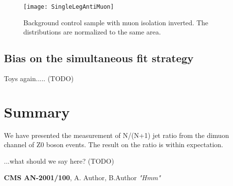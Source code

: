 \documentclass{cmspaper}
\begin{document}
\begin{figure}[hbtp]
\begin{center}
\texttt{[image: SingleLegAntiMuon]}
\caption{Background control sample with muon isolation inverted.  The distributions are normalized to the same area.}
\label{Figure_AntiMuonSingleLeg}
\end{center}
\end{figure}

\subsection{Bias on the simultaneous fit strategy}

Toys again.....  (TODO)

\section{Summary}

We have presented the measurement of N/(N+1) jet ratio from the dimuon channel of Z0 boson events.
The result on the ratio is within expectation.

...what should we say here?  (TODO)


\begin{thebibliography}{9}
    {\bf CMS AN-2001/100},
      A. Author, B.Author
      {\em "Hmm"}
\end{thebibliography}
 
\pagebreak
\end{document}
